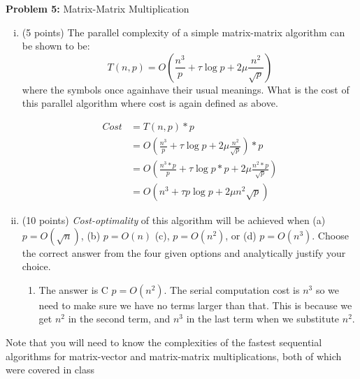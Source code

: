 \documentclass{article}
\begin{document}
    \textbf{Problem 5:} Matrix-Matrix Multiplication
    \begin{enumerate}[i.]
    \item (5 points) The parallel complexity of a simple matrix-matrix algorithm can be shown to be:
    \begin{equation}
        T(n,p) = O(\frac{n^3}{p} + \tau\log{p}+2\mu\frac{n^2}{\sqrt{p}})
    \end{equation}
    where the symbols once againhave their usual meanings. What is the cost of this parallel algorithm
where cost is again defined as above.

    \begin{align*}
        Cost &= T(n,p) * p\\
        &= O(\frac{n^3}{p} + \tau\log{p}+2\mu\frac{n^2}{\sqrt{p}})*p\\
        &= O(\frac{n^3*p}{p} + \tau\log{p}*p+2\mu\frac{n^2*p}{\sqrt{p}})\\
        &= O(n^3 + \tau{p}\log{p} + 2\mu{n^2}\sqrt{p})
    \end{align*}

    \item (10 points) \textit{Cost-optimality} of this algorithm will be achieved when (a) $p = O(\sqrt{n})$, (b) $p = O(n)$ (c),
    $p = O(n^2)$, or (d) $p = O(n^3)$. Choose the correct answer from the four given options and analytically
    justify your choice.

    \begin{enumerate}
        \item The answer is C $p = O(n^2)$. The serial computation cost is $n^3$ so we need to make sure we have no terms larger than that.
        This is because we get $n^2$ in the second term, and $n^3$ in the last term when we substitute $n^2$.
    \end{enumerate}
    \end{enumerate}

Note that you will need to know the complexities of the fastest sequential algorithms for matrix-vector and
matrix-matrix multiplications, both of which were covered in class

    
\end{document}
